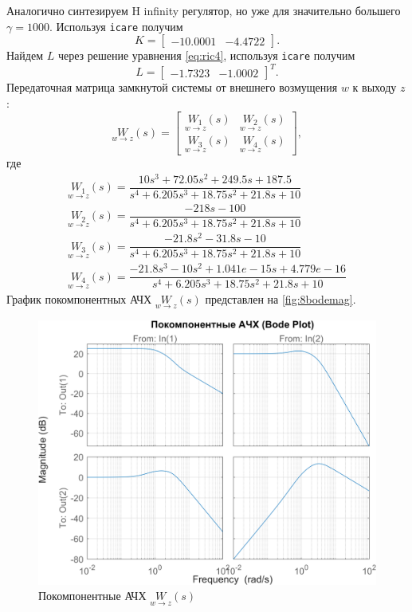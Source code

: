 Аналогично синтезируем H infinity регулятор, но уже для значительно большего $\gamma=1000$.
Используя \texttt{icare} получим
\begin{equation*}
    K=\begin{bmatrix}
        -10.0001	&-4.4722
    \end{bmatrix}.
\end{equation*}
Найдем $L$ через решение уравнения \eqref{eq:ric4}, используя \texttt{icare} получим
\begin{equation*}
    L=\begin{bmatrix}
        -1.7323&
        -1.0002
    \end{bmatrix}^T.
\end{equation*}
Передаточная матрица замкнутой системы от внешнего возмущения $w$ к выходу $z$:
\begin{equation*}
    \underset{w\rightarrow z}{W}(s)=\begin{bmatrix}
        \underset{w\rightarrow z}{W_1}(s) & \underset{w\rightarrow z}{W_2}(s)\\
        \underset{w\rightarrow z}{W_3}(s) & \underset{w\rightarrow z}{W_4}(s)
    \end{bmatrix},
\end{equation*}
где
\begin{gather*}
    \underset{w\rightarrow z}{W_1}(s)=\dfrac{10 s^3 + 72.05 s^2 + 249.5 s + 187.5}{s^4 + 6.205 s^3 + 18.75 s^2 + 21.8 s + 10}\\
    \underset{w\rightarrow z}{W_2}(s)=\dfrac{-218 s - 100}{s^4 + 6.205 s^3 + 18.75 s^2 + 21.8 s + 10}\\
    \underset{w\rightarrow z}{W_3}(s)=\dfrac{-21.8 s^2 - 31.8 s - 10}{s^4 + 6.205 s^3 + 18.75 s^2 + 21.8 s + 10}\\
    \underset{w\rightarrow z}{W_4}(s)=\dfrac{-21.8 s^3 - 10 s^2 + 1.041e-15 s + 4.779e-16}{s^4 + 6.205 s^3 + 18.75 s^2 + 21.8 s + 10}
\end{gather*}
График покомпонентных АЧХ $\underset{w\rightarrow z}{W}(s)$ представлен на \autoref{fig:8bodemag}.
\begin{figure}[H]
    \centering
    \includegraphics[width=0.8\linewidth]{figs/8_bodemag.png}
    \caption{Покомпонентные АЧХ $\underset{w\rightarrow z}{W}(s)$}
    \label{fig:8bodemag}
\end{figure}

